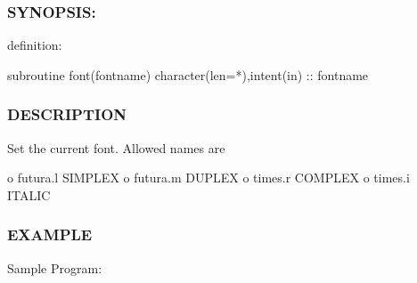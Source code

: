 \subsubsection*{S\+Y\+N\+O\+P\+S\+IS\+:}

definition\+: \begin{DoxyVerb}   subroutine font(fontname)
   character(len=*),intent(in) :: fontname
\end{DoxyVerb}


\subsubsection*{D\+E\+S\+C\+R\+I\+P\+T\+I\+ON}

Set the current font. Allowed names are

o futura.\+l S\+I\+M\+P\+L\+EX o futura.\+m D\+U\+P\+L\+EX o times.\+r C\+O\+M\+P\+L\+EX o times.\+i I\+T\+A\+L\+IC

\subsubsection*{E\+X\+A\+M\+P\+LE}

Sample Program\+:

